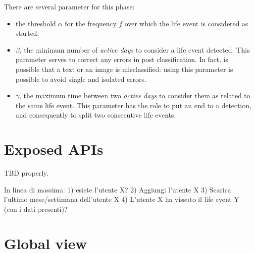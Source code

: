 There are several parameter for this phase: 
\begin{itemize}
\item the threshold $\alpha$ for the frequency $f$ over which the life event is considered as started.
\item $\beta$, the minimum number of \textit{active days} to consider a life event detected. This parameter serves to correct any errors in post classification. In fact, is possible that a text or an image is misclassified: using this parameter is possible to avoid single and isolated errors.
\item $\gamma$, the maximum time between two \textit{active days} to consider them as related to the same life event. This parameter has the role to put an end to a detection, and consequently to split two consecutive life events.
\end{itemize}

\section{Exposed APIs}

TBD properly.

In linea di massima: 1) esiste l'utente X? 2) Aggiungi l'utente X 3) Scarica l'ultimo mese/settimana dell'utente X 4) L'utente X ha vissuto il life event Y (con i dati presenti)?

\section{Global view}
